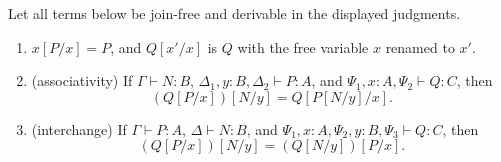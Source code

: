 \begin{lemma}
\label{lemma:join_free_subst_properties}
Let all terms below be join-free and derivable in the displayed judgments.
\begin{enumerate}
  \item\label{jf_prop:unit} $x[P/x] = P$, and $Q[x'/x]$ is $Q$ with the free variable $x$ renamed to $x'$.
  \item\label{jf_prop:assoc} (associativity) If $\Gamma \vdash N : B$, $\Delta_1, y : B, \Delta_2 \vdash P : A$, and $\Psi_1, x : A, \Psi_2 \vdash Q : C$, then
  \[
  (Q[P/x])[N/y] = Q[P[N/y]/x].
  \]
  \item\label{jf_prop:inter} (interchange) If $\Gamma \vdash P : A$, $\Delta \vdash N : B$, and $\Psi_1, x : A, \Psi_2, y : B, \Psi_3 \vdash Q : C$, then
  \[
  (Q[P/x])[N/y] = (Q[N/y])[P/x].
  \]
\end{enumerate}
\end{lemma}
